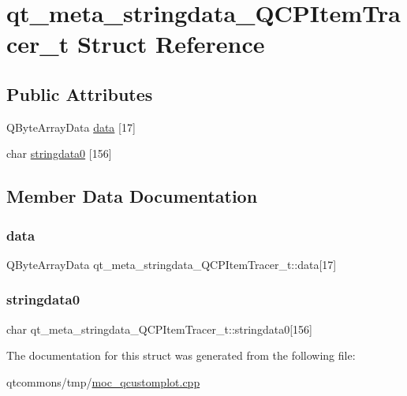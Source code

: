 \hypertarget{structqt__meta__stringdata___q_c_p_item_tracer__t}{}\section{qt\+\_\+meta\+\_\+stringdata\+\_\+\+Q\+C\+P\+Item\+Tracer\+\_\+t Struct Reference}
\label{structqt__meta__stringdata___q_c_p_item_tracer__t}
\subsection*{Public Attributes}
\begin{DoxyCompactItemize}
\item 
Q\+Byte\+Array\+Data \mbox{\hyperlink{structqt__meta__stringdata___q_c_p_item_tracer__t_a22eae99e6c4a456148200505b43289b8}{data}} \mbox{[}17\mbox{]}
\item 
char \mbox{\hyperlink{structqt__meta__stringdata___q_c_p_item_tracer__t_a716a4a42fdc434d4a1e9e7b141e3715d}{stringdata0}} \mbox{[}156\mbox{]}
\end{DoxyCompactItemize}


\subsection{Member Data Documentation}
\mbox{\label{structqt__meta__stringdata___q_c_p_item_tracer__t_a22eae99e6c4a456148200505b43289b8}} 
\subsubsection{\texorpdfstring{data}{data}}
{\footnotesize\ttfamily Q\+Byte\+Array\+Data qt\+\_\+meta\+\_\+stringdata\+\_\+\+Q\+C\+P\+Item\+Tracer\+\_\+t\+::data\mbox{[}17\mbox{]}}

\mbox{\label{structqt__meta__stringdata___q_c_p_item_tracer__t_a716a4a42fdc434d4a1e9e7b141e3715d}} 
\subsubsection{\texorpdfstring{stringdata0}{stringdata0}}
{\footnotesize\ttfamily char qt\+\_\+meta\+\_\+stringdata\+\_\+\+Q\+C\+P\+Item\+Tracer\+\_\+t\+::stringdata0\mbox{[}156\mbox{]}}



The documentation for this struct was generated from the following file\+:\begin{DoxyCompactItemize}
\item 
qtcommons/tmp/\mbox{\hyperlink{moc__qcustomplot_8cpp}{moc\+\_\+qcustomplot.\+cpp}}\end{DoxyCompactItemize}

